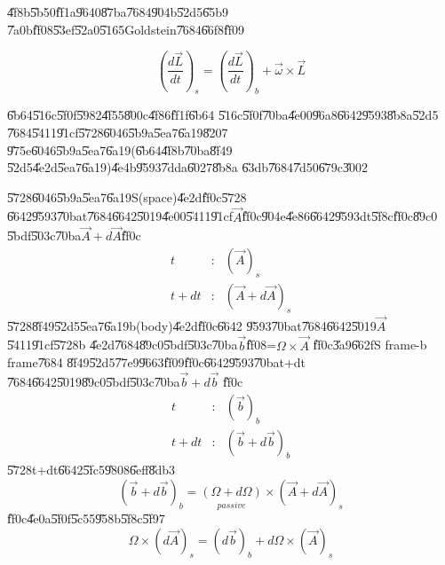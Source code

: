\documentclass[12pt]{article}
\begin{document}
\U{4f8b}\U{5b50}\U{ff1a}\U{9640}\U{87ba}\U{7684}\U{904b}\U{52d5}\U{65b9}%
\U{7a0b}\U{ff08}\U{53ef}\U{52a0}\U{5165}Goldstein\U{7684}\U{66f8}\U{ff09}

\begin{equation}
\left( \frac{d\vec{L}}{dt}\right) _{s}=\left( \frac{d\vec{L}}{dt}\right)
_{b}+\vec{\omega}\times \vec{L}
\end{equation}

\U{6b64}\U{516c}\U{5f0f}\U{5982}\U{4f55}\U{800c}\U{4f86}\U{ff1f}\U{6b64}%
\U{516c}\U{5f0f}\U{70ba}\U{4e00}\U{96a8}\U{6642}\U{9593}\U{8b8a}\U{52d5}%
\U{7684}\U{5411}\U{91cf}\U{5728}\U{6046}\U{5b9a}\U{5ea7}\U{6a19}\U{8207}%
\U{975e}\U{6046}\U{5b9a}\U{5ea7}\U{6a19}(\U{6b64}\U{4f8b}\U{70ba}\U{8f49}%
\U{52d5}\U{4e2d}\U{5ea7}\U{6a19})\U{4e4b}\U{9593}\U{7dda}\U{6027}\U{8b8a}%
\U{63db}\U{7684}\U{7d50}\U{679c}\U{3002}

\bigskip

\U{5728}\U{6046}\U{5b9a}\U{5ea7}\U{6a19}S(space)\U{4e2d}\U{ff0c}\U{5728}%
\U{6642}\U{9593}\U{70ba}t\U{7684}\U{6642}\U{5019}\U{4e00}\U{5411}\U{91cf}$%
\vec{A}$\U{ff0c}\U{904e}\U{4e86}\U{6642}\U{9593}dt\U{5f8c}\U{ff0c}\U{89c0}%
\U{5bdf}\U{503c}\U{70ba}$\vec{A}+d\vec{A}$\U{ff0c}%
\begin{eqnarray}
t &:&(\vec{A})_{s} \\
t+dt &:&\left( \vec{A}+d\vec{A}\right) _{s}
\end{eqnarray}%
\U{5728}\U{8f49}\U{52d5}\U{5ea7}\U{6a19}b(body)\U{4e2d}\U{ff0c}\U{6642}%
\U{9593}\U{70ba}t\U{7684}\U{6642}\U{5019}$\vec{A}$\U{5411}\U{91cf}\U{5728}b%
\U{4e2d}\U{7684}\U{89c0}\U{5bdf}\U{503c}\U{70ba}$\vec{b}$\U{ff08}=$\Omega
\times \vec{A}$ \U{ff0c}\U{3a9}\U{662f}S frame-\TEXTsymbol{>}b frame\U{7684}%
\U{8f49}\U{52d5}\U{77e9}\U{9663}\U{ff09}\U{ff0c}\U{6642}\U{9593}\U{70ba}t+dt%
\U{7684}\U{6642}\U{5019}\U{89c0}\U{5bdf}\U{503c}\U{70ba}$\vec{b}+d\vec{b}$%
\U{ff0c}%
\begin{eqnarray}
t &:&\left( \vec{b}\right) _{b} \\
t+dt &:&\left( \vec{b}+d\vec{b}\right) _{b}
\end{eqnarray}%
\U{5728}t+dt\U{6642}\U{5fc5}\U{9808}\U{6eff}\U{8db3}%
\begin{equation}
\left( \vec{b}+d\vec{b}\right) _{b}=\underset{passive}{\left( \Omega
+d\Omega \right) }\times \left( \vec{A}+d\vec{A}\right) _{s}
\end{equation}%
\U{ff0c}\U{4e0a}\U{5f0f}\U{5c55}\U{958b}\U{5f8c}\U{5f97}%
\begin{equation}
\Omega \times \left( d\vec{A}\right) _{s}=\left( d\vec{b}\right)
_{b}+d\Omega \times \left( \vec{A}\right) _{s}
\end{equation}
\end{document}
